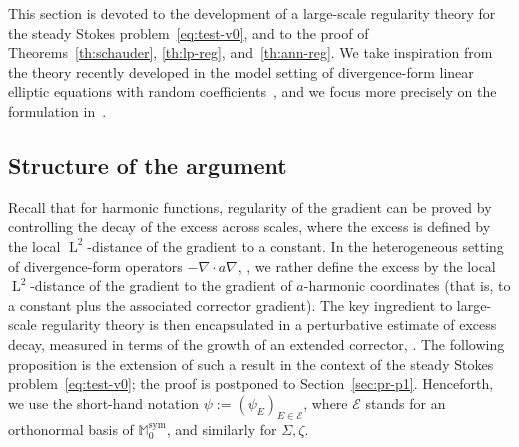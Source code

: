 \documentclass[10pt]{amsart}
\let\mathcal\mathscr
\theoremstyle{plain}
\theoremstyle{definition}
\newcommand{\Ec}{\mathcal E}
\newcommand{\Md}{\mathbb M}
\newcommand{\Ld}{\operatorname{L}}
\newcommand{\Sym}{{\operatorname{sym}}}
\begin{document}
This section is devoted to the development of a large-scale regularity theory for the steady Stokes problem~\eqref{eq:test-v0}, and to the proof of Theorems~\ref{th:schauder}, \ref{th:lp-reg}, and~\ref{th:ann-reg}.
We take inspiration from the theory recently developed in the model setting of divergence-form linear elliptic equations with random coefficients~\cite{AS,AM-16,AKM1,AKM2,AKM-book,GNO-reg,DO1,JO}, and we focus more precisely on the formulation in~\cite{GNO-reg,DO1}.

\subsection{Structure of the argument}

Recall that for harmonic functions, regularity of the gradient can be proved by controlling the decay of the excess across scales, where the excess is defined by the local $\Ld^2$-distance of the gradient to a constant.
In the heterogeneous setting of divergence-form operators $-\nabla \cdot a \nabla$, \cf \cite{GNO-reg}, we rather define the excess by the local $\Ld^2$-distance of the gradient to the gradient of $a$-harmonic coordinates (that is, to a constant plus the associated corrector gradient).
The key ingredient to large-scale regularity theory is then encapsulated in a perturbative estimate of excess decay, measured in terms of the growth of an extended corrector, \cf \cite[Prop.\,1]{GNO-reg}.
The following proposition is the extension of such a result in the context of the steady Stokes problem~\eqref{eq:test-v0};
the proof is postponed to Section~\ref{sec:pr-p1}.
Henceforth, we use the short-hand notation $\psi:=(\psi_E)_{E\in\Ec}$, where $\Ec$ stands for an orthonormal basis of $\Md_0^\Sym$, and similarly for $\Sigma,\zeta$.
\end{document}
